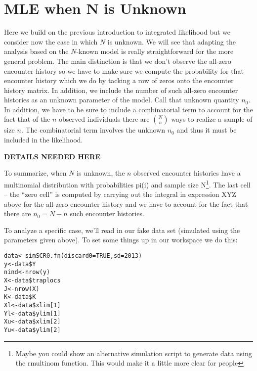 \section{MLE when N is Unknown} 

Here we build on the previous introduction to integrated likelihood
but we consider now the case in which $N$ is unknown. We will see that
adapting the analysis based on the $N$-known model is really
straightforward for the more general problem. The main distinction is
that we don’t observe the all-zero encounter history so we have to
make sure we compute the probability for that encounter history which
we do by tacking a row of zeros onto the encounter history matrix. In
addition, we include the number of such all-zero encounter histories
as an unknown parameter of the model. Call that unknown quantity $n_{0}$.
In addition, we have to be sure to include a combinatorial term to
account for the fact that of the $n$ observed individuals there are
${N \choose n}$
 ways to realize a sample of size $n$. The combinatorial term
involves the unknown $n_{0}$ and thus it must be included in the likelihood.

{\bf DETAILS NEEDED HERE }

To summarize, when $N$ is unknown, the $n$ observed encounter histories
have a multinomial distribution with probabilities pi(i) and sample
size N\footnote{ Maybe you could show an alternative simulation script
  to generate data using the rmultinom function. This would make it a
  little more clear for people}. The last cell – the ``zero cell'' is
computed by carrying out the integral in expression XYZ above for the
all-zero encounter history and we have to account for the fact that
there are $n_{0} = N-n$ such encounter histories.

To analyze a specific case, we’ll read in our fake data set (simulated
using the parameters given above). To set some things up in our
workspace we do this:
\begin{verbatim}
data<-simSCR0.fn(discard0=TRUE,sd=2013)
y<-data$Y
nind<-nrow(y)
X<-data$traplocs
J<-nrow(X)
K<-data$K
Xl<-data$xlim[1]
Yl<-data$ylim[1]
Xu<-data$xlim[2]
Yu<-data$ylim[2]
\end{verbatim}

